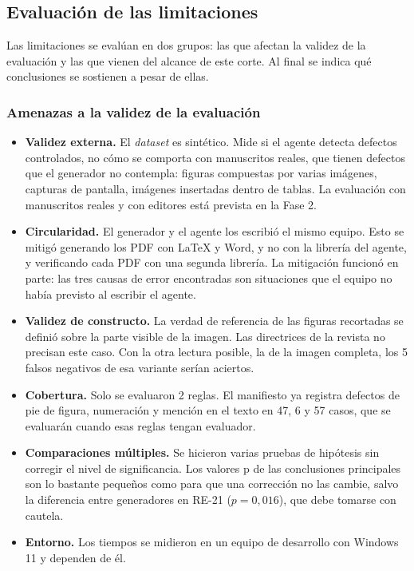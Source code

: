 \subsection{Evaluación de las limitaciones}

Las limitaciones se evalúan en dos grupos: las que afectan la validez de la evaluación y las que vienen del alcance de este corte. Al final se indica qué conclusiones se sostienen a pesar de ellas.

\subsubsection*{Amenazas a la validez de la evaluación}

\begin{itemize}
  \item \textbf{Validez externa.} El \emph{dataset} es sintético. Mide si el agente detecta defectos controlados, no cómo se comporta con manuscritos reales, que tienen defectos que el generador no contempla: figuras compuestas por varias imágenes, capturas de pantalla, imágenes insertadas dentro de tablas. La evaluación con manuscritos reales y con editores está prevista en la Fase 2.
  \item \textbf{Circularidad.} El generador y el agente los escribió el mismo equipo. Esto se mitigó generando los PDF con LaTeX y Word, y no con la librería del agente, y verificando cada PDF con una segunda librería. La mitigación funcionó en parte: las tres causas de error encontradas son situaciones que el equipo no había previsto al escribir el agente.
  \item \textbf{Validez de constructo.} La verdad de referencia de las figuras recortadas se definió sobre la parte visible de la imagen. Las directrices de la revista no precisan este caso. Con la otra lectura posible, la de la imagen completa, los 5 falsos negativos de esa variante serían aciertos.
  \item \textbf{Cobertura.} Solo se evaluaron 2 reglas. El manifiesto ya registra defectos de pie de figura, numeración y mención en el texto en 47, 6 y 57 casos, que se evaluarán cuando esas reglas tengan evaluador.
  \item \textbf{Comparaciones múltiples.} Se hicieron varias pruebas de hipótesis sin corregir el nivel de significancia. Los valores p de las conclusiones principales son lo bastante pequeños como para que una corrección no las cambie, salvo la diferencia entre generadores en RE-21 ($p = 0{,}016$), que debe tomarse con cautela.
  \item \textbf{Entorno.} Los tiempos se midieron en un equipo de desarrollo con Windows 11 y dependen de él.
\end{itemize}

